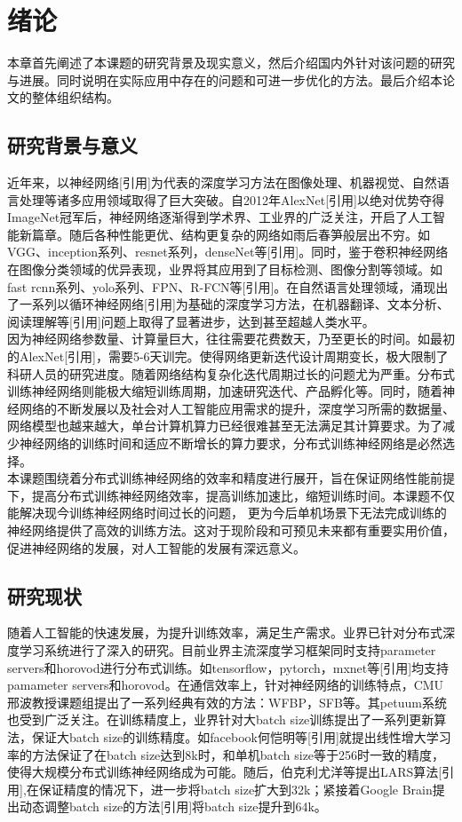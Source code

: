 \chapter{绪论}
本章首先阐述了本课题的研究背景及现实意义，然后介绍国内外针对该问题的研究与进展。同时说明在实际应用中存在的问题和可进一步优化的方法。最后介绍本论文的整体组织结构。
\section{研究背景与意义}
近年来，以神经网络[引用]为代表的深度学习方法在图像处理、机器视觉、自然语言处理等诸多应用领域取得了巨大突破。自2012年AlexNet[引用]以绝对优势夺得ImageNet冠军后，神经网络逐渐得到学术界、工业界的广泛关注，开启了人工智能新篇章。随后各种性能更优、结构更复杂的网络如雨后春笋般层出不穷。如VGG、inception系列、resnet系列，denseNet等[引用]。同时，鉴于卷积神经网络在图像分类领域的优异表现，业界将其应用到了目标检测、图像分割等领域。如fast rcnn系列、yolo系列、FPN、R-FCN等[引用]。在自然语言处理领域，涌现出了一系列以循环神经网络[引用]为基础的深度学习方法，在机器翻译、文本分析、阅读理解等[引用]问题上取得了显著进步，达到甚至超越人类水平。\\
因为神经网络参数量、计算量巨大，往往需要花费数天，乃至更长的时间。如最初的AlexNet[引用]，需要5-6天训完。使得网络更新迭代设计周期变长，极大限制了科研人员的研究进度。随着网络结构复杂化迭代周期过长的问题尤为严重。分布式训练神经网络则能极大缩短训练周期，加速研究迭代、产品孵化等。同时，随着神经网络的不断发展以及社会对人工智能应用需求的提升，深度学习所需的数据量、网络模型也越来越大，单台计算机算力已经很难甚至无法满足其计算要求。为了减少神经网络的训练时间和适应不断增长的算力要求，分布式训练神经网络是必然选择。\\
本课题围绕着分布式训练神经网络的效率和精度进行展开，旨在保证网络性能前提下，提高分布式训练神经网络效率，提高训练加速比，缩短训练时间。本课题不仅能解决现今训练神经网络时间过长的问题， 更为今后单机场景下无法完成训练的神经网络提供了高效的训练方法。这对于现阶段和可预见未来都有重要实用价值，促进神经网络的发展，对人工智能的发展有深远意义。

\section{研究现状}
随着人工智能的快速发展，为提升训练效率，满足生产需求。业界已针对分布式深度学习系统进行了深入的研究。目前业界主流深度学习框架同时支持parameter servers和horovod进行分布式训练。如tensorflow，pytorch，mxnet等[引用]均支持pamameter servers和horovod。在通信效率上，针对神经网络的训练特点，CMU邢波教授课题组提出了一系列经典有效的方法：WFBP，SFB等。其petuum系统也受到广泛关注。在训练精度上，业界针对大batch size训练提出了一系列更新算法，保证大batch size的训练精度。如facebook何恺明等[引用]就提出线性增大学习率的方法保证了在batch size达到8k时，和单机batch size等于256时一致的精度，使得大规模分布式训练神经网络成为可能。随后，伯克利尤洋等提出LARS算法[引用],在保证精度的情况下，进一步将batch size扩大到32k；紧接着Google Brain提出动态调整batch size的方法[引用]将batch size提升到64k。
